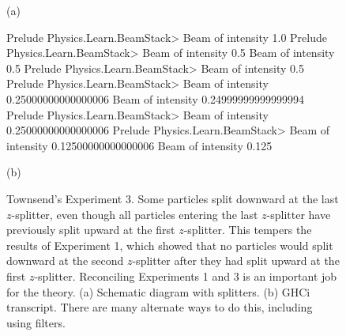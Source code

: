 \documentclass[12pt]{article}
\newcommand{\FunctionTok}[1]{\textcolor[rgb]{0.02,0.16,0.49}{{#1}}}
\newcommand{\darkgreen}[1]{\textcolor[rgb]{0.00,0.80,0.00}{#1}}
\begin{document}
\begin{figure}
  \begin{center}

(a)
  \end{center}
\begin{center}
\begin{Highlighting}[]
Prelude Physics.Learn.BeamStack> \color{blue}{randomBeam}
\darkgreen{Beam of intensity 1.0}
Prelude Physics.Learn.BeamStack> \color{blue}{splitZ it}
\darkgreen{Beam of intensity 0.5}
\darkgreen{Beam of intensity 0.5}
Prelude Physics.Learn.BeamStack> \color{blue}{dropBeam it}
\darkgreen{Beam of intensity 0.5}
Prelude Physics.Learn.BeamStack> \color{blue}{splitX it}
\darkgreen{Beam of intensity 0.25000000000000006}
\darkgreen{Beam of intensity 0.24999999999999994}
Prelude Physics.Learn.BeamStack> \color{blue}{dropBeam it}
\darkgreen{Beam of intensity 0.25000000000000006}
Prelude Physics.Learn.BeamStack> \color{blue}{splitZ it}
\darkgreen{Beam of intensity 0.12500000000000006}
\darkgreen{Beam of intensity 0.125}
\end{Highlighting}

(b)
\end{center}
\caption{Townsend's Experiment 3.  Some particles split downward
  at the last $z$-splitter, even though all particles entering the
  last $z$-splitter have previously split upward at the first
  $z$-splitter.  This tempers the results of Experiment 1,
  which showed that no particles would split downward at the second $z$-splitter
  after they had split upward at the first $z$-splitter.
  Reconciling Experiments 1 and 3 is an important job for the theory.
  (a) Schematic diagram with splitters.
  (b) GHCi transcript.  There are many alternate ways to do this,
  including using filters.
}
\label{townsend3fig}
\end{figure}
\end{document}
